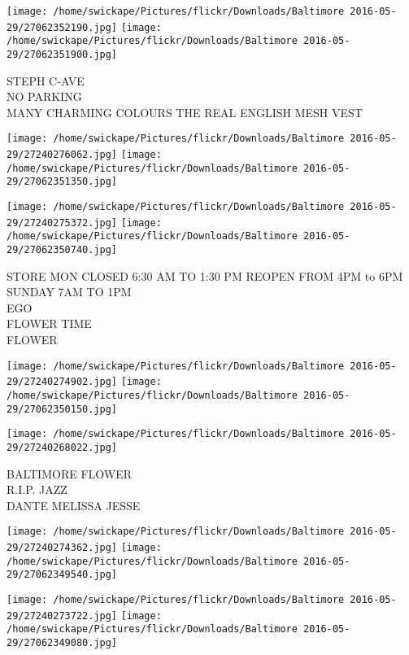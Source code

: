 \documentclass[10pt,letterpaper]{article}
\begin{document}
\vspace{0.25in}
\texttt{[image: /home/swickape/Pictures/flickr/Downloads/Baltimore 2016-05-29/27062352190.jpg]}
\texttt{[image: /home/swickape/Pictures/flickr/Downloads/Baltimore 2016-05-29/27062351900.jpg]}

STEPH C{-}AVE\\
NO PARKING\\
MANY CHARMING COLOURS THE REAL ENGLISH MESH VEST\\
\pagebreak

\texttt{[image: /home/swickape/Pictures/flickr/Downloads/Baltimore 2016-05-29/27240276062.jpg]}
\texttt{[image: /home/swickape/Pictures/flickr/Downloads/Baltimore 2016-05-29/27062351350.jpg]}

\texttt{[image: /home/swickape/Pictures/flickr/Downloads/Baltimore 2016-05-29/27240275372.jpg]}
\texttt{[image: /home/swickape/Pictures/flickr/Downloads/Baltimore 2016-05-29/27062350740.jpg]}

STORE MON CLOSED 6:30 AM TO 1:30 PM REOPEN FROM 4PM to 6PM SUNDAY 7AM TO 1PM\\
EGO\\
FLOWER TIME\\
FLOWER\\
\pagebreak

\texttt{[image: /home/swickape/Pictures/flickr/Downloads/Baltimore 2016-05-29/27240274902.jpg]}
\texttt{[image: /home/swickape/Pictures/flickr/Downloads/Baltimore 2016-05-29/27062350150.jpg]}

\vspace{0.25in}
\texttt{[image: /home/swickape/Pictures/flickr/Downloads/Baltimore 2016-05-29/27240268022.jpg]}

BALTIMORE FLOWER\\
R.I.P. JAZZ\\
DANTE MELISSA JESSE\\
\pagebreak

\texttt{[image: /home/swickape/Pictures/flickr/Downloads/Baltimore 2016-05-29/27240274362.jpg]}
\texttt{[image: /home/swickape/Pictures/flickr/Downloads/Baltimore 2016-05-29/27062349540.jpg]}

\texttt{[image: /home/swickape/Pictures/flickr/Downloads/Baltimore 2016-05-29/27240273722.jpg]}
\texttt{[image: /home/swickape/Pictures/flickr/Downloads/Baltimore 2016-05-29/27062349080.jpg]}
\end{document}
